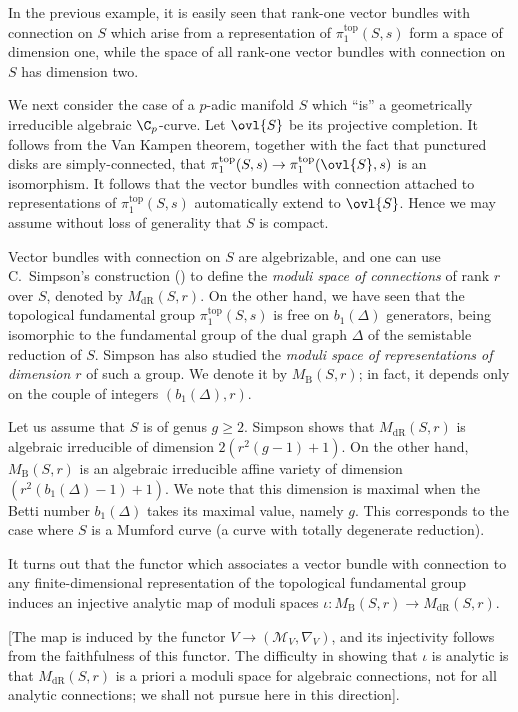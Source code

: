 \begin{para}\label{para-Simpson} 
 In the previous example, it is easily seen that rank-one vector bundles
 with connection on $S$ which arise from a representation of
 $\pi_1^{\mathrm{top}}(S,s)$ form a space of dimension one, while the
 space of all rank-one vector bundles with connection on $S$ has
 dimension two. 

 We next consider the case of a $p$-adic manifold $S$ which ``is'' a
 geometrically irreducible algebraic ${\C}_p$-curve. Let $\ovl{S}$ be
 its projective completion. It follows from the Van Kampen theorem,
 together with the fact that punctured disks are simply-connected, that
 $\pi_1^{\mathrm{top}}(S,s) \to \pi_1^{\mathrm{top}}(\ovl{S},s)$ is
 an isomorphism. It 
 follows that the vector bundles with connection attached to
 representations of $\pi_1^{\mathrm{top}}(S,s)$ automatically extend
 to $\ovl{S}$. Hence we may assume without loss of generality that $S$ is
 compact.

 Vector bundles with connection on $S$ are algebrizable, and one can
 use C.~Simpson's construction (\cite{morotfgoaspv1}) to define the {\it
 moduli space of connections} of rank $r$ over $S$, denoted by
 $M_{\mathrm{dR}}(S,r)$. On the other hand, we have seen that the topological
 fundamental group $\pi_1^{\mathrm{top}}(S,s)$ is free on $b_1(\Delta)$
generators, being isomorphic to the fundamental group of the dual graph
$\Delta$ of the semistable reduction of $S$. Simpson has also studied
the {\it moduli space of representations of dimension $r$} of such a
group. We denote it by $M_{\mathrm{B}}(S,r)$; in fact, it depends only on the
couple of integers $(b_1(\Delta),r)$.

 Let us assume that $S$ is of genus $g\geq 2$. Simpson shows that 
 $M_{\mathrm{dR}}(S,r)$ is algebraic irreducible of dimension
 $2(r^2(g-1)+1)$.   On the other hand, $M_{\mathrm{B}}(S,r)$ is an algebraic
 irreducible affine variety of dimension $(r^2(b_1(\Delta)-1)+1)$.  We
 note that this dimension is maximal when the Betti number $b_1(\Delta
 )$ takes its maximal value, namely $g$. This corresponds to the case 
 where $S$ is a Mumford curve (a curve with totally degenerate reduction).  

 It turns out that the functor which associates a vector
 bundle with connection to any finite-dimensional representation of the
 topological fundamental group induces an {\rm injective analytic map}
 of moduli spaces $\iota : M_{\mathrm{B}}(S,r)\to M_{\mathrm{dR}}(S,r)$.

[The map is induced by the functor $V \to (\mathcal{M}_V,{\nabla}_V)$,
and its injectivity follows from the faithfulness of this functor. The
difficulty in showing that $\iota$ is analytic is that
$M_{\mathrm{dR}}(S,r)$ is 
a priori a moduli space for algebraic connections, not for all analytic
connections; we shall not pursue here in this direction].


\end{para}

